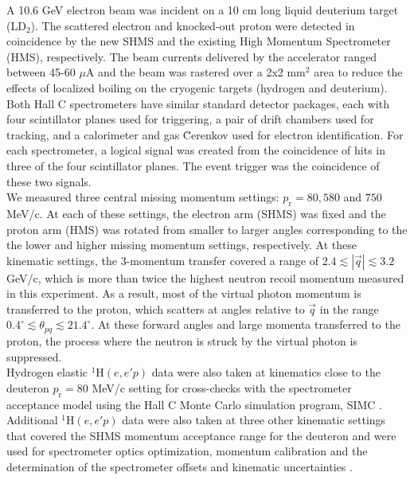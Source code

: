 \indent A 10.6 GeV electron beam was incident on a 10 cm long liquid deuterium target (LD$_{2}$). The scattered electron and knocked-out proton were detected in coincidence
by the new SHMS and the existing High Momentum Spectrometer (HMS), respectively. The beam currents delivered by the accelerator ranged between 45-60 $\mu$A and the beam was rastered over a 2x2 mm$^{2}$ area to reduce the effects of localized boiling on the cryogenic targets (hydrogen and deuterium).\\
\indent Both Hall C spectrometers have similar standard detector packages, each with four scintillator planes \cite{hodo_techreport} used for triggering, a pair of drift chambers \cite{dc_techreport} used for tracking, and a calorimeter \cite{Mkrtchyan_2013} and gas \u{C}erenkov \cite{Li_Wenliang_mthesis,ngc_techreport} used for electron identification.
For each spectrometer, a logical signal was created from  the coincidence of hits in three of the four scintillator planes. The event trigger was the coincidence of these two signals. \\
\indent We measured three central missing momentum settings: $p_{\mathrm{r}}=80, 580$ and $750$ MeV/c. At each of these settings, the electron arm (SHMS) was fixed and the proton arm (HMS) was rotated from smaller to larger angles corresponding to the
the lower and higher missing momentum settings, respectively. At these kinematic settings, the 3-momentum transfer covered a range of $2.4\lesssim|\vec{q}|\lesssim3.2$ GeV/c, which is more than twice the highest neutron recoil momentum
measured in this experiment. As a result, most of the virtual photon momentum is transferred to the proton, which scatters at angles relative to $\vec{q}$ in the range $0.4^{\circ}\lesssim \theta_{pq}\lesssim21.4^{\circ}$.
At these forward angles and large momenta transferred to the proton, the  process where the neutron is struck by the virtual photon is suppressed.\\
\indent Hydrogen elastic $^{1}\mathrm{H}(e,e'p)$ data were also taken at kinematics close to the deuteron $p_{\mathrm{r}}=80$ MeV/c setting for cross-checks with the spectrometer acceptance model using the  Hall C Monte Carlo
simulation program, SIMC \cite{PhysRevC.64.054610}. Additional $^{1}\mathrm{H}(e,e'p)$ data were also taken at three other kinematic settings that covered the SHMS momentum acceptance range for the deuteron and were used for spectrometer optics optimization, 
momentum calibration and the determination of the spectrometer offsets and kinematic uncertainties \cite{cyero_phdthesis}.\\
